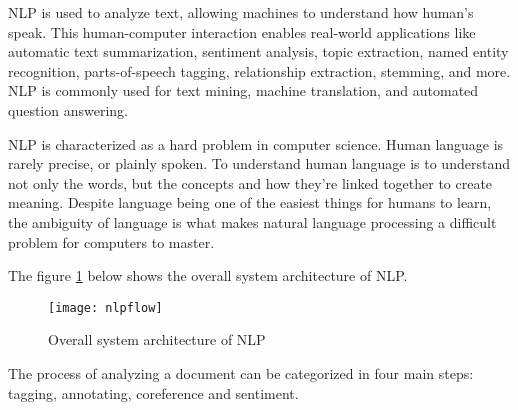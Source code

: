 NLP is used to analyze text, allowing machines to understand how human’s speak. This human-computer interaction enables real-world applications like automatic text summarization, sentiment analysis, topic extraction, named entity recognition, parts-of-speech tagging, relationship extraction, stemming, and more. NLP is commonly used for text mining, machine translation, and automated question answering. 

NLP is characterized as a hard problem in computer science. Human language is rarely precise, or plainly spoken. To understand human language is to understand not only the words, but the concepts and how they’re linked together to create meaning. Despite language being one of the easiest things for humans to learn, the ambiguity of language is what makes natural language processing a difficult problem for computers to master. 

The figure \ref{fig_nlp} \cite{corenlp} below shows the overall system architecture of NLP.

\begin{figure}[H]
\centering
\texttt{[image: nlpflow]}
\caption{Overall system architecture of NLP}
\label{fig_nlp}
\end{figure}
\newpage

The process of analyzing a document can be categorized in four main steps: tagging, annotating, coreference and sentiment.

